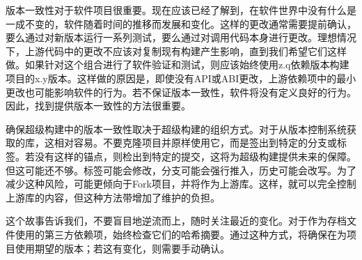 
版本一致性对于软件项目很重要。现在应该已经了解到，在软件世界中没有什么是一成不变的，软件随着时间的推移而发展和变化。这样的更改通常需要提前确认，要么通过对新版本运行一系列测试，要么通过对调用代码本身进行更改。理想情况下，上游代码中的更改不应该对复制现有构建产生影响，直到我们希望它们这样做。如果针对这个组合进行了软件验证和测试，则应该始终使用z.q依赖版本构建项目的x.y版本。这样做的原因是，即使没有API或ABI更改，上游依赖项中的最小更改也可能影响软件的行为。若不保证版本一致性，软件将没有定义良好的行为。因此，找到提供版本一致性的方法很重要。

确保超级构建中的版本一致性取决于超级构建的组织方式。对于从版本控制系统获取的库，这相对容易。不要克隆项目并原样使用它，而是签出到特定的分支或标签。若没有这样的锚点，则检出到特定的提交，这将为超级构建提供未来的保障。但这可能还不够。标签可能会修改，分支可能会强行推入，历史可能会改写。为了减少这种风险，可能更倾向于Fork项目，并将作为上游库。这样，就可以完全控制上游库的内容，但这种方法带增加了维护的负担。

这个故事告诉我们，不要盲目地逆流而上，随时关注最近的变化。对于作为存档文件使用的第三方依赖项，始终检查它们的哈希摘要。通过这种方式，将确保在为项目使用期望的版本；若这有变化，则需要手动确认。












































